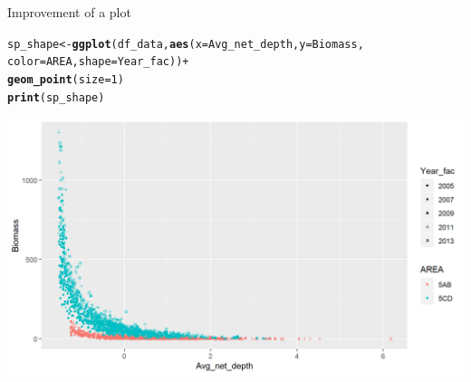 \documentclass{beamer}\usepackage[]{graphicx}\usepackage[]{color}
\makeatletter
\newcommand{\hlnum}[1]{\textcolor[rgb]{0.686,0.059,0.569}{#1}}%
\newcommand{\hlopt}[1]{\textcolor[rgb]{0,0,0}{#1}}%
\newcommand{\hlstd}[1]{\textcolor[rgb]{0.345,0.345,0.345}{#1}}%
\newcommand{\hlkwb}[1]{\textcolor[rgb]{0.69,0.353,0.396}{#1}}%
\newcommand{\hlkwc}[1]{\textcolor[rgb]{0.333,0.667,0.333}{#1}}%
\newcommand{\hlkwd}[1]{\textcolor[rgb]{0.737,0.353,0.396}{\textbf{#1}}}%
\newenvironment{kframe}{%
 \def\at@end@of@kframe{}%
 \ifinner\ifhmode%
  \def\at@end@of@kframe{\end{minipage}}%
  \begin{minipage}{\columnwidth}%
 \fi\fi%
 \def\FrameCommand##1{\hskip\@totalleftmargin \hskip-\fboxsep
 \colorbox{shadecolor}{##1}\hskip-\fboxsep
     \hskip-\linewidth \hskip-\@totalleftmargin \hskip\columnwidth}%
 \MakeFramed {\advance\hsize-\width
   \@totalleftmargin\z@ \linewidth\hsize
   \@setminipage}}%
 {\par\unskip\endMakeFramed%
 \at@end@of@kframe}
\newenvironment{knitrout}{}{} %
\makeatother
\begin{document}
\begin{frame}[fragile]{Improvement of a plot}
\begin{knitrout}\footnotesize
{}\color{fgcolor}\begin{kframe}
\begin{alltt}
\hlstd{sp_shape} \hlkwb{<-} \hlkwd{ggplot}\hlstd{(df_data,} \hlkwd{aes}\hlstd{(}\hlkwc{x}\hlstd{=Avg_net_depth,} \hlkwc{y}\hlstd{=Biomass,}
                                \hlkwc{color}\hlstd{=AREA,} \hlkwc{shape}\hlstd{=Year_fac))} \hlopt{+}
  \hlkwd{geom_point}\hlstd{(}\hlkwc{size}\hlstd{=}\hlnum{1}\hlstd{)}
\hlkwd{print}\hlstd{(sp_shape)}
\end{alltt}
\end{kframe}

{\centering \includegraphics[width=.9\linewidth]{figure/sp_shape2-1} 

}



\end{knitrout}
\end{frame}
\end{document}
